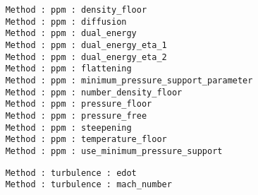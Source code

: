 \begin{frame}[fragile,label=ss-param-method]
\begin{verbatim}
    Method : ppm : density_floor
    Method : ppm : diffusion
    Method : ppm : dual_energy
    Method : ppm : dual_energy_eta_1
    Method : ppm : dual_energy_eta_2
    Method : ppm : flattening
    Method : ppm : minimum_pressure_support_parameter
    Method : ppm : number_density_floor
    Method : ppm : pressure_floor
    Method : ppm : pressure_free
    Method : ppm : steepening
    Method : ppm : temperature_floor
    Method : ppm : use_minimum_pressure_support
\end{verbatim}

\begin{verbatim}
    Method : turbulence : edot
    Method : turbulence : mach_number
\end{verbatim}
\end{frame}

